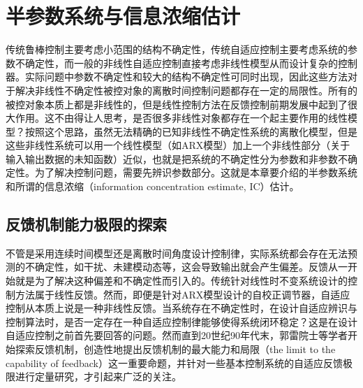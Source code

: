 \chapter{半参数系统与信息浓缩估计}\label{chap:2}
传统鲁棒控制主要考虑小范围的结构不确定性，传统自适应控制主要考虑系统的参数不确定性，而一般的非线性自适应控制直接考虑非线性模型从而设计复杂的控制器。实际问题中参数不确定性和较大的结构不确定性可同时出现，因此这些方法对于解决非线性不确定性被控对象的离散时间控制问题都存在一定的局限性。所有的被控对象本质上都是非线性的，但是线性控制方法在反馈控制前期发展中起到了很大作用。这不由得让人思考，是否很多非线性对象都存在一个起主要作用的线性模型？按照这个思路，虽然无法精确的已知非线性不确定性系统的离散化模型，但是这些非线性系统可以用一个线性模型（如ARX模型）加上一个非线性部分（关于输入输出数据的未知函数）近似，也就是把系统的不确定性分为参数和非参数不确定性。为了解决控制问题，需要先辨识参数部分。这就是本章要介绍的半参数系统和所谓的信息浓缩（information concentration estimate, IC）估计。

\section{反馈机制能力极限的探索}\label{sect:2.1}
不管是采用连续时间模型还是离散时间角度设计控制律，实际系统都会存在无法预测的不确定性，如干扰、未建模动态等，这会导致输出就会产生偏差。反馈从一开始就是为了解决这种偏差和不确定性而引入的。传统针对线性时不变系统设计的控制方法属于线性反馈。然而，即便是针对ARX模型设计的自校正调节器，自适应控制从本质上说是一种非线性反馈。当系统存在不确定性时，在设计自适应辨识与控制算法时，是否一定存在一种自适应控制律能够使得系统闭环稳定？这是在设计自适应控制之前首先要回答的问题。然而直到20世纪90年代末，郭雷院士等学者开始探索反馈机制，创造性地提出反馈机制的最大能力和局限（the limit to the capability of feedback）这一重要命题，并针对一些基本控制系统的自适应反馈极限进行定量研究，才引起来广泛的关注。

